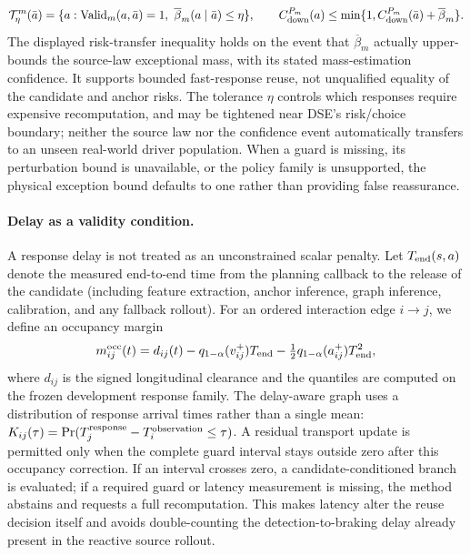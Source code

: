 \documentclass[10pt]{article}
\begin{document}
\begin{equation}
 \mathcal T_{\eta}^{m}(\bar a)=\{a:\operatorname{Valid}_m(a,\bar a)=1,
 \ \overline\beta_m(a\mid\bar a)\le\eta\},\qquad
 C_{\rm down}^{P_m}(a)\le\min\{1,C_{\rm down}^{P_m}(\bar a)+\overline\beta_m\}.
 \label{eq:trustregion}
\end{equation}
The displayed risk-transfer inequality holds on the event that $\overline\beta_m$ actually upper-bounds the source-law exceptional mass, with its stated mass-estimation confidence. It supports bounded fast-response reuse, not unqualified equality of the candidate and anchor risks. The tolerance $\eta$ controls which responses require expensive recomputation, and may be tightened near DSE's risk/choice boundary; neither the source law nor the confidence event automatically transfers to an unseen real-world driver population. When a guard is missing, its perturbation bound is unavailable, or the policy family is unsupported, the physical exception bound defaults to one rather than providing false reassurance.

\paragraph{Delay as a validity condition.}
A response delay is not treated as an unconstrained scalar penalty.  Let
$T_{\rm end}(s,a)$ denote the measured end-to-end time from the planning
callback to the release of the candidate (including feature extraction,
anchor inference, graph inference, calibration, and any fallback rollout).
For an ordered interaction edge $i\to j$, we define an occupancy margin
\[
 m_{ij}^{\rm occ}(t)=d_{ij}(t)-q_{1-\alpha}(v_{ij}^{+})T_{\rm end}
 -\tfrac12 q_{1-\alpha}(a_{ij}^{+})T_{\rm end}^{2},
\]
where $d_{ij}$ is the signed longitudinal clearance and the quantiles are
computed on the frozen development response family.  The delay-aware graph
uses a distribution of response arrival times rather than a single mean:
$K_{ij}(\tau)=\Pr(T_{j}^{\rm response}-T_{i}^{\rm observation}\le\tau)$.
A residual transport update is permitted only when the complete guard interval
stays outside zero after this occupancy correction.  If an interval crosses
zero, a candidate-conditioned branch is evaluated; if a required guard or
latency measurement is missing, the method abstains and requests a full
recomputation.  This makes latency alter the reuse decision itself and avoids
double-counting the detection-to-braking delay already present in the reactive
source rollout.
\end{document}
